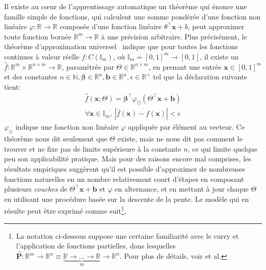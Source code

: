 Il existe au cœur de l'apprentissage automatique un théorème qui énonce une famille simple de fonctions, qui calculent une somme pondérée d'une fonction non linéaire $\varphi : \mathbb{R} \rightarrow \mathbb{R}$ composée d'une fonction linéaire $\theta^\intercal \mathbf{x} + b$, peut approximer toute fonction bornée $\mathbb{R}^m\rightarrow\mathbb{R}$ à une précision arbitraire. Plus précisément, le théorème d'approximation universel~\citep{hornik1989multilayer} indique que pour toutes les fonctions continues à valeur réelle $f : C(\mathbb{I}_m)$, où $\mathbb{I}_m = [0, 1]^m \rightarrow [0, 1]$, il existe un $\hat f : \mathbb{R}^m \times \mathbb{R}^{n \times m} \rightarrow \mathbb{R}$, paramétrée par $\Theta \in \mathbb{R}^{n \times m}$, en prenant une entrée $\mathbf x \in [0, 1]^m$ et des constantes $n \in \mathbb{N}, \mathbf{\beta} \in \mathbb{R}^n, \mathbf{b} \in \mathbb{R}^n, \epsilon \in \mathbb{R}^+$ tel que la déclaration suivante tient:
%
\begin{equation}
    \begin{split}
        \hat{f}(\mathbf{x}; \Theta) = \mathbf{\beta}^\intercal \varphi_{\odot} \left(\Theta^\intercal \mathbf{x} + \mathbf{b}\right) \\
        \forall \mathbf{x} \in \mathbb{I}_m, \ | \hat f( \mathbf{x} ) - f ( \mathbf{x} ) | < \epsilon
    \end{split}
\end{equation}
%
$\varphi_{\odot}$ indique une fonction non linéaire $\varphi$ appliquée par élément au vecteur. Ce théorème nous dit seulement que $\Theta$ existe, mais ne nous dit pas comment le trouver et ne fixe pas de limite supérieure à la constante $n$, ce qui limite quelque peu son applicabilité pratique. Mais pour des raisons encore mal comprises, les résultats empiriques suggèrent qu'il est possible d'approximer de nombreuses fonctions naturelles en un nombre relativement court d'étapes en composant plusieurs \textit{couches} de $\Theta^\intercal \mathbf{x} + \mathbf{b}$ et $\varphi$ en alternance, et en mettant à jour chaque $\Theta$ en utilisant une procédure basée sur la descente de la pente. Le modèle qui en résulte peut être exprimé comme suit\footnote{La notation ci-dessous suppose une certaine familiarité avec le curry et l'application de fonctions partielles, dans lesquelles $\mathbf{\hat P}: \mathbb{R}^m \rightarrow \mathbb{R}^n \equiv \underbrace{\mathbb R \rightarrow \ldots \rightarrow \mathbb R}_{m}\rightarrow \mathbb{R}^n$. Pour plus de détails, voir \citet{schonfinkel1924bausteine, curry1958combinatory} et al.},
